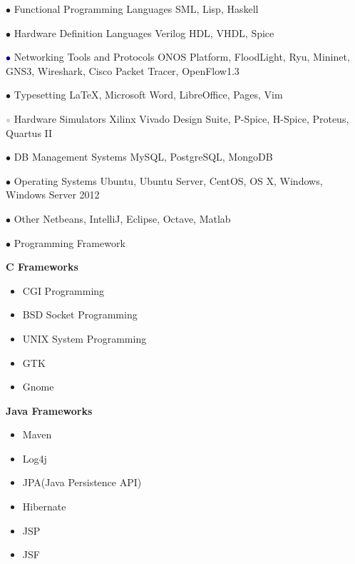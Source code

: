 \documentclass[]{friggeri-cv} %
\begin{document}
\begin{entrylist}

\entry
{\textcolor{TextGreen}{$\bullet$}}
{Functional Programming Languages}
{}
{SML, Lisp, Haskell}


\entry
{\textcolor{TextOrange}{$\bullet$}}
{Hardware Definition Languages}
{}
{Verilog HDL, VHDL, Spice}


\entry
{\textcolor{DarkBlue}{$\bullet$}}
{Networking Tools and Protocols}
{}
{ONOS Platform, FloodLight, Ryu, Mininet, GNS3, Wireshark, Cisco Packet Tracer, OpenFlow1.3}


\entry
{\textcolor{Ocean}{$\bullet$}}
{Typesetting}
{}
{\LaTeX, Microsoft Word, LibreOffice, Pages, Vim}


\entry
{\textcolor{LightGray}{$\bullet$}}
{Hardware Simulators}
{}
{Xilinx Vivado Design Suite, P-Spice, H-Spice, Proteus, Quartus II}


\entry
{\textcolor{TextYellow}{$\bullet$}}
{DB Management Systems}
{}
{MySQL, PostgreSQL, MongoDB}


\entry
{\textcolor{TextRed}{$\bullet$}}
{Operating Systems}
{}
{Ubuntu, Ubuntu Server, CentOS, OS X, Windows, Windows Server 2012}


\entry
{\textcolor{TextPink}{$\bullet$}}
{Other}
{}
{Netbeans, IntelliJ, Eclipse, Octave, Matlab}


\entry
{\textcolor{UniBlue}{$\bullet$}}
{Programming Framework}
{}
{
	\textbf{C Frameworks}
	\begin{itemize}
		\item CGI Programming
		\item BSD Socket Programming
		\item UNIX System Programming
		\item GTK
		\item Gnome
	\end{itemize}
	
	\textbf{Java Frameworks}
	\begin{itemize}
		\item Maven
		\item Log4j
		\item JPA(Java Persistence API)
		\item Hibernate
		\item JSP
		\item JSF
	\end{itemize}
}



\end{entrylist}
\end{document}
